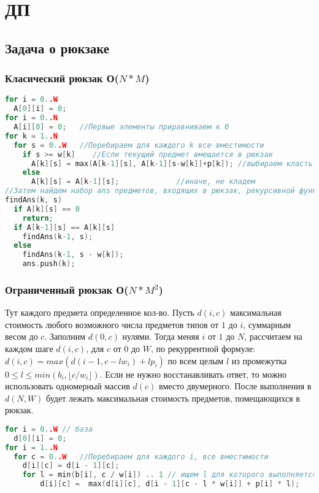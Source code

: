 \chapter{ДП}
\section{Задача о рюкзаке}
\subsection{Класический рюкзак О($N*M$)}
\begin{lstlisting}[language = C++]
for i = 0..W
  A[0][i] = 0;
for i = 0..N
  A[i][0] = 0;   //Первые элементы приравниваем к 0
for k = 1..N               
  for s = 0..W   //Перебираем для каждого k все вместимости 
    if s >= w[k]    //Если текущий предмет вмещается в рюкзак
      A[k][s] = max(A[k-1][s], A[k-1][s-w[k]]+p[k]); //выбираем класть его или нет
    else 
      A[k][s] = A[k-1][s];             //иначе, не кладем
//Затем найдем набор ans предметов, входящих в рюкзак, рекурсивной функцией:
findAns(k, s)
  if A[k][s] == 0 
    return;
  if A[k-1][s] == A[k][s]
    findAns(k-1, s);
  else 
    findAns(k-1, s - w[k]);
    ans.push(k);
\end{lstlisting}
\subsection{Ограниченный рюкзак О($N*M^2$)}
Тут каждого предмета определенное кол-во.\newline
Пусть $d(i,c)$ максимальная стоимость любого возможного числа предметов типов от $1$ до $i$, суммарным весом до $c$.
Заполним $d(0,c)$ нулями.
Тогда меняя $i$ от $1$ до $N$, рассчитаем на каждом шаге $d(i,c)$, для $c$ от $0$ до $W$, по рекуррентной формуле:
$d(i,c) = max(d(i - 1, c - lw_i) + lp_i)$ по всем целым $l$ из промежутка $0 \le l \le min(b_i,\lfloor c/w_i \rfloor)$.
Если не нужно восстанавливать ответ, то можно использовать одномерный массив $d(c)$ вместо двумерного.
После выполнения в $d(N,W)$ будет лежать максимальная стоимость предметов, помещающихся в рюкзак.
\begin{lstlisting}[language = C++]
for i = 0..W // база
  d[0][i] = 0;
for i = 1..N             
  for c = 0..W   //Перебираем для каждого i, все вместимости 
    d[i][c] = d[i - 1][c];
    for l = min(b[i], c / w[i]) .. 1 // ищем l для которого выполняется максимум
        d[i][c] =  max(d[i][c], d[i - 1][c - l * w[i]] + p[i] * l);
\end{lstlisting}
